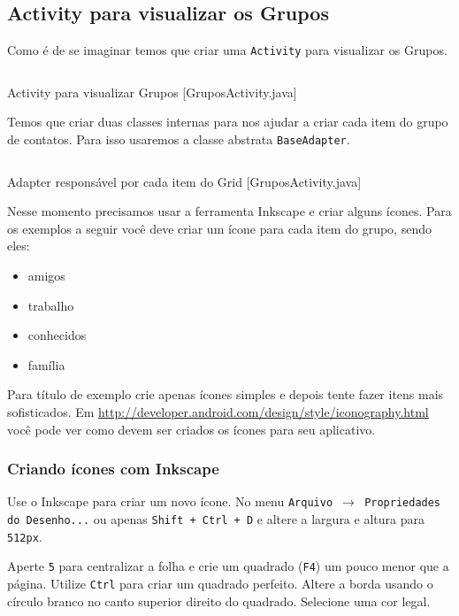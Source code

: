 \subsection{Activity para visualizar os Grupos}

Como é de se imaginar temos que criar uma \texttt{Activity} para visualizar os Grupos.

\begin{listing}[H]
  \inputminted[linenos=true,frame=bottomline,tabsize=3]{ java }{ source/GruposActivity-1.java }
  \caption{Activity para visualizar Grupos [GruposActivity.java]}
\end{listing}

Temos que criar duas classes internas para nos ajudar a criar cada item do grupo de contatos.
Para isso usaremos a classe abstrata \texttt{BaseAdapter}.

\begin{listing}[H]
  \inputminted[linenos=true,frame=bottomline,tabsize=3]{ java }{ source/GruposActivity-2.java }
  \caption{Adapter responsável por cada item do Grid [GruposActivity.java]}
\end{listing}

Nesse momento precisamos usar a ferramenta Inkscape e criar alguns ícones. Para os exemplos a seguir
você deve criar um ícone para cada item do grupo, sendo eles:

\begin{itemize}
	\item amigos
	\item trabalho
	\item conhecidos
	\item família
\end{itemize}

Para título de exemplo crie apenas ícones simples e depois tente fazer itens mais sofisticados. Em
\url{http://developer.android.com/design/style/iconography.html} você pode ver como devem ser criados
os ícones para seu aplicativo.

\subsubsection{Criando ícones com Inkscape}

Use o Inkscape para criar um novo ícone. No menu \texttt{Arquivo $\rightarrow$
Propriedades do Desenho...} ou apenas \texttt{Shift + Ctrl + D} e altere a largura e altura
para \texttt{512px}.

Aperte \texttt{5} para centralizar a folha e crie um quadrado (\texttt{F4}) um pouco menor que a página.
Utilize \texttt{Ctrl} para criar um quadrado perfeito. Altere a borda usando o círculo branco no canto
superior direito do quadrado. Selecione uma cor legal.

